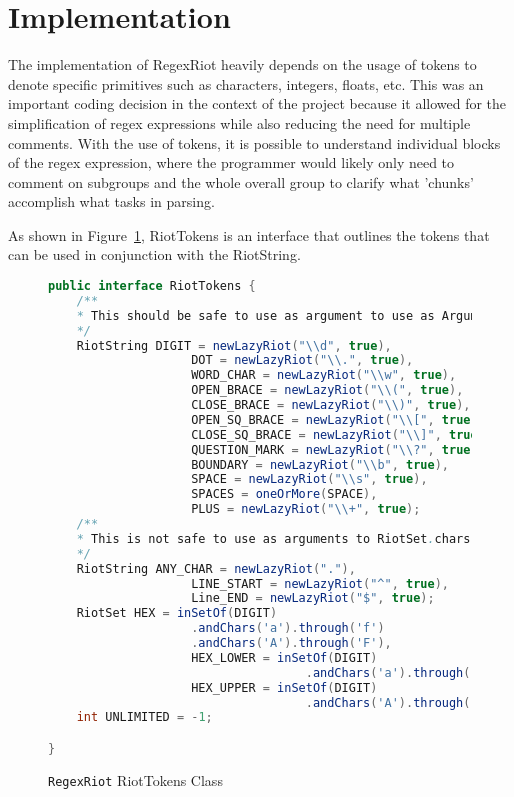 \documentclass[conference]{IEEEtran}
\begin{document}
\section{Implementation}
The implementation of RegexRiot heavily depends on the usage of tokens to denote specific
primitives such as characters, integers, floats, etc. This was an important coding decision
in the context of the project because it allowed for the simplification of regex expressions
while also reducing the need for multiple comments. With the use of tokens, it is possible to
understand individual blocks of the regex expression, where the programmer would likely only
need to comment on subgroups and the whole overall group to clarify what 'chunks' accomplish
what tasks in parsing.

As shown in Figure~\ref{fig:regexriot-riot-tokens}, RiotTokens is an interface that outlines the tokens that can
be used in conjunction with the RiotString.

\begin{figure}[htbp]
    \centering
    \label{fig:regexriot-riot-tokens}
    \begin{lstlisting}[language=Java]
public interface RiotTokens {
    /**
    * This should be safe to use as argument to use as Argument to RiotSet.chars()
    */
    RiotString DIGIT = newLazyRiot("\\d", true),
                    DOT = newLazyRiot("\\.", true),
                    WORD_CHAR = newLazyRiot("\\w", true),
                    OPEN_BRACE = newLazyRiot("\\(", true),
                    CLOSE_BRACE = newLazyRiot("\\)", true),
                    OPEN_SQ_BRACE = newLazyRiot("\\[", true),
                    CLOSE_SQ_BRACE = newLazyRiot("\\]", true),
                    QUESTION_MARK = newLazyRiot("\\?", true),
                    BOUNDARY = newLazyRiot("\\b", true),
                    SPACE = newLazyRiot("\\s", true),
                    SPACES = oneOrMore(SPACE),
                    PLUS = newLazyRiot("\\+", true);
    /**
    * This is not safe to use as arguments to RiotSet.chars()
    */
    RiotString ANY_CHAR = newLazyRiot("."),
                    LINE_START = newLazyRiot("^", true),
                    Line_END = newLazyRiot("$", true);
    RiotSet HEX = inSetOf(DIGIT)
                    .andChars('a').through('f')
                    .andChars('A').through('F'),
                    HEX_LOWER = inSetOf(DIGIT)
                                    .andChars('a').through('f'),
                    HEX_UPPER = inSetOf(DIGIT)
                                    .andChars('A').through('F');
    int UNLIMITED = -1;

}
            \end{lstlisting}
    \caption{\texttt{RegexRiot} RiotTokens Class}
\end{figure}
\end{document}
